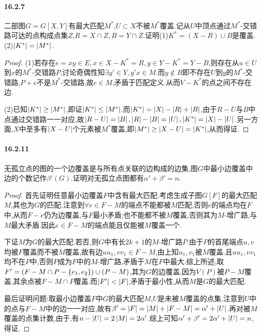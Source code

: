 \documentclass[11pt]{article}
\begin{document}
\paragraph{16.2.7}二部图$G=G[X,Y]$有最大匹配$M^*$,$U\subset X$不被$M^*$覆盖.记从$U$中顶点通过$M^*$-交错路可达的点构成点集$Z$,$R=X\cap Z, B=Y\cap Z$.证明(1)$K^*=(X-R)\cup B$是覆盖.(2)$\left|K^*\right|=\left|M^*\right|$.
\begin{proof}
    (1)若存在$e=xy\in E, x\in X-K^*=R, y\in Y-K^*=Y-B$,则存在从$u\in U$到$x$的$M^*$-交错路$P$,讨论奇偶性知$\exists y'\in Y, y'x\in M$.而$y\notin B$即不存在$U$到$y$的$M^*$-交错路,$P+e$不是$M^*$-交错路,故$e\in M$,矛盾于匹配定义.从而$V-K^*$的点之间不存在边.

    (2)已知$\left|K^*\right|\geq\left|M^*\right|$,即证$\left|K^*\right|\leq\left|M^*\right|$.而$\left|K^*\right|=\left|X\right|-\left|R\right|+\left|B\right|$,由于$R-U$与$B$中点通过交错路一一对应,故$\left|R-U\right|=\left|B\right|, \left|R\right|-\left|B\right|=\left|U\right|, \left|K^*\right|=\left|X\right|-\left|U\right|$.另一方面,$X$中至多有$\left|X-U\right|$个元素被$M^*$覆盖,即$\left|M^*\right|\geq \left|X-U\right|=\left|K^*\right|$,从而得证.
\end{proof}

\paragraph{16.2.11}无孤立点的图的一个边覆盖是与所有点关联的边构成的边集,图$G$中最小边覆盖中边的个数记作$\beta'(G)$.证明对无孤立点图都有$\alpha'+\beta'=n$.
\begin{proof}
    首先证明任意最小边覆盖$F$中含有最大匹配.考虑生成子图$G[F]$的最大匹配$M$,其也为$G$的匹配.注意到$\forall e\in F-M$的端点不能都被$M$匹配,否则$e$的端点均在$F$中,从而$F-e$仍为边覆盖,与$F$最小矛盾;也不能都不被$M$覆盖,否则其为$M$-增广路,与$M$最大矛盾.因此$e\in F-M$的端点能且仅能被$M$覆盖一个.
    
    下证$M$为$G$的最大匹配.若否,则$G$中有长$2k+1$的$M$-增广路$P$.由于$P$的首尾端点$u,v$均被$F$覆盖而不被$M$覆盖,故有边$uu_1,vv_1\in F-M$,由上知$u_1,v_1$被$M$覆盖.且$uu_1,vv_1$均不在$P$中,否则$P$成为$F$中的$M$-增广路,矛盾于$M$在$F$中最大.综上所述,取$F'=(F-M\cap P-\left\{e_1,e_2\right\})\cup (P-M)$,其为$G$的边覆盖,因为$V(P)$被$P-M$覆盖,其余点被$F-M\cap P$覆盖.而$\left|F'\right|<\left|F\right|$,矛盾于最小性,从而$M$是$G$的最大匹配.

    最后证明问题:取最小边覆盖$F$中$G$的最大匹配$M$,$U$是未被$M$覆盖的点集,注意到$U$中的点与$F-M$中的边一一对应,故有$\beta'=\left|F\right|=\left|M\right|+\left|F-M\right|=\alpha'+\left|U\right|$.再对被$M$覆盖的点集计数,由于,有$n-\left|U\right|=2\left|M\right|=2\alpha'$.综上可知$\alpha'+\beta'=2\alpha'+\left|U\right|=n$,得证.
\end{proof}
\end{document}
